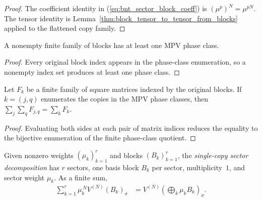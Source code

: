 \begin{proof}\leanok
    The coefficient identity in
    (\ref{eq:bnt_sector_block_coeff}) is $(\mu^p)^N=\mu^{pN}$. The tensor
    identity is Lemma~\ref{thm:block_tensor_to_tensor_from_blocks} applied to
    the flattened copy family.
\end{proof}

\begin{lemma}
    \label{lem:mpv_phase_class_nonempty}
    \leanok
    A nonempty finite family of blocks has at least one MPV phase class.
\end{lemma}

\begin{proof}\leanok
    Every original block index appears in the phase-class enumeration, so a
    nonempty index set produces at least one phase class.
\end{proof}

\begin{lemma}
    \label{lem:mpv_phase_class_regroup_matrix}
    \leanok
    Let $F_k$ be a finite family of square matrices indexed by the original
    blocks. If $k=(j,q)$ enumerates the copies in the MPV phase classes, then
    $\sum_j\sum_q F_{j,q}=\sum_k F_k$.
\end{lemma}

\begin{proof}\leanok
    Evaluating both sides at each pair of matrix indices reduces the equality to
    the bijective enumeration of the finite phase-class quotient.
\end{proof}

\begin{definition}
    \label{def:trivial_sector_decomp}
    \leanok
    Given nonzero weights $(\mu_k)_{k=1}^r$ and blocks $(B_k)_{k=1}^r$, the
    \emph{single-copy sector decomposition} has $r$ sectors, one basis block
    $B_k$ per sector, multiplicity~$1$, and sector weight $\mu_k$. As a finite
    sum,
    \begin{align}
        \sum_{k=1}^{r}\mu_k^{\,N}V^{(N)}(B_k)_\sigma
         & =
        V^{(N)}\!\left(\bigoplus_k\mu_kB_k\right)_\sigma.
        \label{eq:canonical_single_copy_sector}
    \end{align}
\end{definition}

